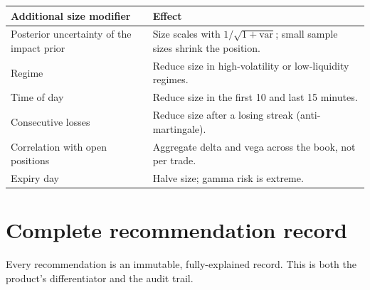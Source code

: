 \begin{longtable}{@{}p{4.8cm}p{9.8cm}@{}}
\toprule
\textbf{Additional size modifier} & \textbf{Effect}\\
\midrule
Posterior uncertainty of the impact prior & Size scales with
$1/\sqrt{1 + \text{var}}$; small sample sizes shrink the position.\\
Regime & Reduce size in high-volatility or low-liquidity regimes.\\
Time of day & Reduce size in the first 10 and last 15 minutes.\\
Consecutive losses & Reduce size after a losing streak (anti-martingale).\\
Correlation with open positions & Aggregate delta and vega across the book, not
per trade.\\
Expiry day & Halve size; gamma risk is extreme.\\
\bottomrule
\end{longtable}

\section{Complete recommendation record}

Every recommendation is an immutable, fully-explained record. This is both the
product's differentiator and the audit trail.

